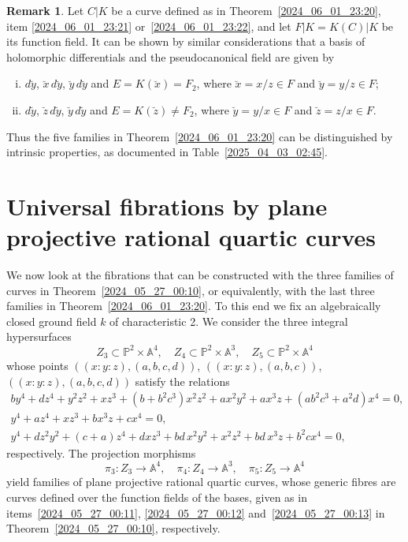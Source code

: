 \documentclass[12pt,reqno]{amsart}
\theoremstyle{definition}
\newtheorem{rem}[thm]{Remark}
\newcommand{\su}{\subset}
\newcommand{\PP}{\mathbb{P}}
\newcommand{\AAA}{\mathbb{A}}
\begin{document}
\begin{rem}
Let $C|K$ be a curve defined as in Theorem~\ref{2024_06_01_23:20}, item \ref{2024_06_01_23:21} or~\ref{2024_06_01_23:22}, and let $F|K=K(C)|K$ be its function field. 
It can be shown by similar considerations that a basis of holomorphic differentials and the pseudocanonical field are given by
\begin{enumerate}[(i)]
   \item $d \breve y$, $\breve x \, d \breve y$, $\breve y \, d \breve y$ and $E=K(\breve x)=F_2$, where $\breve x=x/z\in F$ and $\breve y = y/z \in F$;
   \item $d\breve y$, $\breve z \, d\breve y$, $\breve y \, d \breve y$ and $E=K(\breve z)\neq F_2$, where $\breve y=y/x\in F$ and $\breve z = z/x \in F$.
\end{enumerate}
Thus the five families in Theorem~\ref{2024_06_01_23:20} can be distinguished by intrinsic properties, as documented in Table~\ref{2025_04_03_02:45}.
\end{rem}


\section{Universal fibrations by plane projective rational quartic curves}

We now look at the fibrations that can be constructed with the three families of curves in Theorem~\ref{2024_05_27_00:10}, or equivalently, with the last three families in Theorem~\ref{2024_06_01_23:20}.
To this end we fix an algebraically closed ground field $k$ of characteristic 2.
We consider the three integral hypersurfaces
\[ Z_3 \su \PP^2 \times \AAA^4, \quad Z_4 \su \PP^2 \times \AAA^3, \quad Z_5 \su \PP^2 \times \AAA^4 \]
whose points $((x:y:z),(a,b,c,d))$, $((x:y:z),(a,b,c))$, $((x:y:z),(a,b,c,d))$ satisfy the relations
\begin{gather*}
    b y^4 + d z^4 + y^2 z^2 + x z^3 + (b + b^2 c^3) x^2 z^2 + a x^2 y^2 + a x^3 z + (a b^2 c^3 + a^2 d) x^4 = 0, \\
    y^4 + a z^4 + x z^3 + b x^3 z + c x^4 = 0, \\
    y^4 + d z^2 y^2 + (c+a) z^4 + d x z^3 + bd\, x^2 y^2 + x^2 z^2 + bd\, x^3 z + b^2 c x^4 = 0,
\end{gather*}
respectively.
The projection morphisms
\[ \pi_3:Z_3\to \AAA^4, \quad \pi_4: Z_4\to \AAA^3, \quad %
\pi_5:Z_5 \to \AAA^4  \]
yield families of plane projective rational quartic curves, whose generic fibres are curves defined over the function fields of the bases, given as in items~\ref{2024_05_27_00:11}, \ref{2024_05_27_00:12} and~\ref{2024_05_27_00:13} in Theorem~\ref{2024_05_27_00:10}, respectively.
\end{document}
